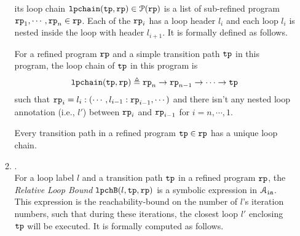 \begin{enumerate}
\begin{enumerate}
  its loop chain $\mathtt{lpchain}(\mathtt{tp}, \mathtt{rp}) \in \mathcal{P}(\mathtt{rp})$ 
  is a list of sub-refined program $\mathtt{rp}_1, \cdots, \mathtt{rp}_n \in \mathtt{rp}$.
  Each of the $\mathtt{rp}_i$ has a loop header $l_i$ and
 each loop $l_{i}$ is nested inside the loop with header $l_{i+1}$. It is formally defined as follows.
\begin{defn}
  \label{def:loopchain}
For a refined program $\mathtt{rp}$ and a simple transition path $\mathtt{tp}$ in this program, the loop chain of
$\mathtt{tp}$ in this program is
%
\[ 
  \mathtt{lpchain}(\mathtt{tp}, \mathtt{rp}) 
  \triangleq 
\mathtt{rp}_n \to \mathtt{rp}_{n-1} \to \cdots \to \mathtt{tp}
\]
such that 
$\mathtt{rp}_{i}= l_i : (\cdots, l_{i - 1} : \mathtt{rp}_{i-1}, \cdots)$ and
 there isn't any nested loop annotation (i.e., $l'$) between $\mathtt{rp}_{i}$ and $\mathtt{rp}_{i - 1}$ for $i = n, \cdots, 1$.
\end{defn}
%
Every transition path in a refined program $\mathtt{tp} \in \mathtt{rp}$ has a unique loop chain.
%
%
%
\item  {}.
\\
For a loop label $l$ and a transition path $\mathtt{tp}$ in a refined program $\mathtt{rp}$,
the \emph{Relative Loop Bound} $\mathtt{lpchB}(l, \mathtt{tp}, \mathtt{rp})$ is a symbolic expression in $\mathcal{A}_{\mathtt{in}}$.
\\
This expression is the 
reachability-bound on the number of $l$'s iteration numbers,
such that during these iterations, the closest loop $l'$ enclosing $\mathtt{tp}$ will be executed.
It is formally computed as follows.

\end{enumerate}
\end{enumerate}
